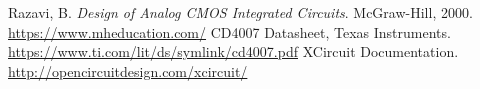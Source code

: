 \documentclass[9pt,conference]{IEEEtran}
\begin{document}
\begin{thebibliography}{00}
Razavi, B. \textit{Design of Analog CMOS Integrated Circuits}. McGraw-Hill, 2000. \url{https://www.mheducation.com/}
CD4007 Datasheet, Texas Instruments. \url{https://www.ti.com/lit/ds/symlink/cd4007.pdf}
XCircuit Documentation. \url{http://opencircuitdesign.com/xcircuit/}
\end{thebibliography}
\end{document}
